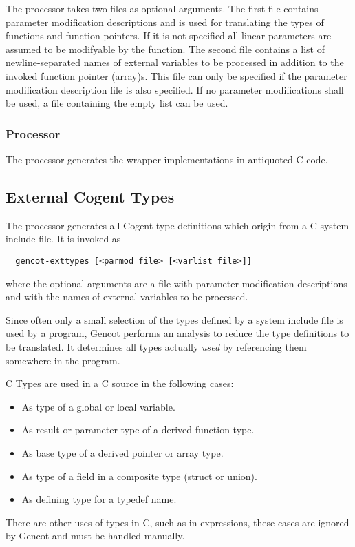 The processor takes two files as optional arguments. The first file contains parameter modification descriptions
and is used for translating the types of functions and function pointers. If it is not specified all linear
parameters are assumed to be modifyable by the function. The second file contains a list of newline-separated 
names of external variables to be processed in addition to the invoked function pointer (array)s. This file can
only be specified if the parameter modification description file is also specified. If no parameter modifications
shall be used, a file containing the empty list \code{[]} can be used.

\subsubsection{Processor }

The processor  generates the wrapper implementations in antiquoted C code.

\subsection{External Cogent Types}
\label{impl-ccomps-exttypes}

The processor  generates all Cogent type definitions which origin from a C system include file.
It is invoked as
\begin{verbatim}
  gencot-exttypes [<parmod file> [<varlist file>]]
\end{verbatim}
where the optional arguments are a file with parameter modification descriptions and with the names of external
variables to be processed.

Since often only a small selection of the types defined by a system include file is used by a program, Gencot performs 
an analysis to reduce the type definitions to be translated. It determines all types actually \textit{used} by
referencing them somewhere in the program.

C Types are used in a C source in the following cases:
\begin{itemize}
\item As type of a global or local variable.
\item As result or parameter type of a derived function type.
\item As base type of a derived pointer or array type.
\item As type of a field in a composite type (struct or union).
\item As defining type for a typedef name.
\end{itemize}
There are other uses of types in C, such as in  expressions, these cases are ignored by Gencot and 
must be handled manually.

